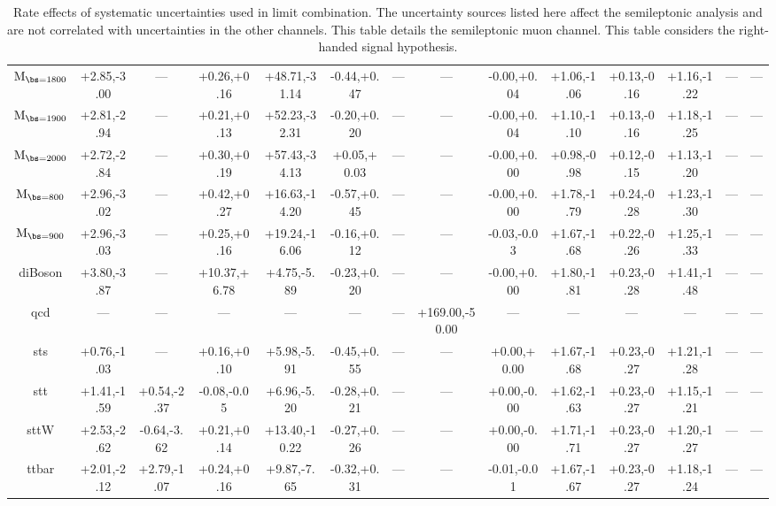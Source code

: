 \begin{table}
\begin{center}
\begin{small}
{\begin{tabular}{c||c|c|c|c|c|c|c|c|c|c|c|c|c}
$\mathrm{M_{\bs=1800}}$ & +2.85,-3.00 & --- & +0.26,+0.16 & +48.71,-31.14 & -0.44,+0.47 & --- & --- & -0.00,+0.04 & +1.06,-1.06 & +0.13,-0.16 & +1.16,-1.22 & --- & --- \\  
$\mathrm{M_{\bs=1900}}$ & +2.81,-2.94 & --- & +0.21,+0.13 & +52.23,-32.31 & -0.20,+0.20 & --- & --- & -0.00,+0.04 & +1.10,-1.10 & +0.13,-0.16 & +1.18,-1.25 & --- & --- \\  
$\mathrm{M_{\bs=2000}}$ & +2.72,-2.84 & --- & +0.30,+0.19 & +57.43,-34.13 & +0.05,+0.03 & --- & --- & -0.00,+0.00 & +0.98,-0.98 & +0.12,-0.15 & +1.13,-1.20 & --- & --- \\  
$\mathrm{M_{\bs=800}}$ & +2.96,-3.02 & --- & +0.42,+0.27 & +16.63,-14.20 & -0.57,+0.45 & --- & --- & -0.00,+0.00 & +1.78,-1.79 & +0.24,-0.28 & +1.23,-1.30 & --- & --- \\  
$\mathrm{M_{\bs=900}}$ & +2.96,-3.03 & --- & +0.25,+0.16 & +19.24,-16.06 & -0.16,+0.12 & --- & --- & -0.03,-0.03 & +1.67,-1.68 & +0.22,-0.26 & +1.25,-1.33 & --- & --- \\  
diBoson & +3.80,-3.87 & --- & +10.37,+6.78 & +4.75,-5.89 & -0.23,+0.20 & --- & --- & -0.00,+0.00 & +1.80,-1.81 & +0.23,-0.28 & +1.41,-1.48 & --- & --- \\  
qcd & --- & --- & --- & --- & --- & --- & +169.00,-50.00 & --- & --- & --- & --- & --- & --- \\  
sts & +0.76,-1.03 & --- & +0.16,+0.10 & +5.98,-5.91 & -0.45,+0.55 & --- & --- & +0.00,+0.00 & +1.67,-1.68 & +0.23,-0.27 & +1.21,-1.28 & --- & --- \\  
stt & +1.41,-1.59 & +0.54,-2.37 & -0.08,-0.05 & +6.96,-5.20 & -0.28,+0.21 & --- & --- & +0.00,-0.00 & +1.62,-1.63 & +0.23,-0.27 & +1.15,-1.21 & --- & --- \\  
sttW & +2.53,-2.62 & -0.64,-3.62 & +0.21,+0.14 & +13.40,-10.22 & -0.27,+0.26 & --- & --- & +0.00,-0.00 & +1.71,-1.71 & +0.23,-0.27 & +1.20,-1.27 & --- & --- \\  
ttbar & +2.01,-2.12 & +2.79,-1.07 & +0.24,+0.16 & +9.87,-7.65 & -0.32,+0.31 & --- & --- & -0.01,-0.01 & +1.67,-1.67 & +0.23,-0.27 & +1.18,-1.24 & --- & --- \\ 
\hline
\end{tabular}
}
\caption{Rate effects of systematic uncertainties used in limit combination.  The uncertainty sources listed here affect the semileptonic analysis and are not correlated with uncertainties in the other channels.  
This table details the semileptonic muon channel.  This table considers the right-handed signal hypothesis.}
\label{table:bsRsysSl2}

\end{small}
\end{center}
\end{table}

